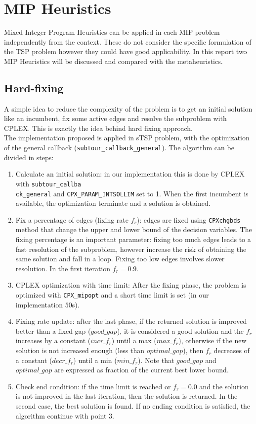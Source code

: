 \chapter{MIP Heuristics}
Mixed Integer Program Heuristics can be applied in each MIP problem independently from the context. These do not consider the specific formulation of the TSP problem however they could have good applicability. In this report two MIP Heuristics will be discussed and compared with the metaheuristics.

\section{Hard-fixing}
A simple idea to reduce the complexity of the problem is to get an initial solution like an incumbent, fix some active edges and resolve the subproblem with CPLEX. This is exactly the idea behind hard fixing approach.\\
The implementation proposed is applied in sTSP problem, with the optimization of the general callback (\texttt{subtour\_callback\_general}).
The algorithm can be divided in steps:
\begin{enumerate} \label{hard-fix-step}
	\item Calculate an initial solution: in our implementation this is done by CPLEX with \texttt{subtour\_callba \\ ck\_general} and \texttt{CPX\_PARAM\_INTSOLLIM} set to 1. When the first incumbent is available, the optimization terminate and a solution is obtained.
	\item Fix a percentage of edges (fixing rate $ f_r $): edges are fixed using \texttt{CPXchgbds} method that change the upper and lower bound of the decision variables. The fixing percentage is an important parameter: fixing too much edges leads to a fast resolution of the subproblem, however increase the risk of obtaining the same solution and fall in a loop. Fixing too low edges involves slower resolution. In the first iteration $ f_r = 0.9 $.
	\item CPLEX optimization with time limit: After the fixing phase, the problem is optimized with \texttt{CPX\_mipopt} and a short time limit is set (in our implementation $50 $s).
	\item Fixing rate update: after the last phase, if the returned solution is improved better than a fixed gap ($  good\_gap $), it is considered a good solution and the $ f_r $ increases by a constant ($ incr\_f_r $) until a max ($ max\_f_r $), otherwise if the new solution is not increased enough (less than $ optimal\_gap $), then $ f_r $ decreases of a constant ($ decr\_f_r $) until a min ($ min\_f_r $). Note that $ good\_gap $ and $ optimal\_gap $ are expressed as fraction of the current best lower bound.
	\item Check end condition: if the time limit is reached or $ f_r = 0.0 $ and the solution is not improved in the last iteration, then the solution is returned. In the second case, the best solution is found. If no ending condition is satisfied, the algorithm continue with point 3.
\end{enumerate}

